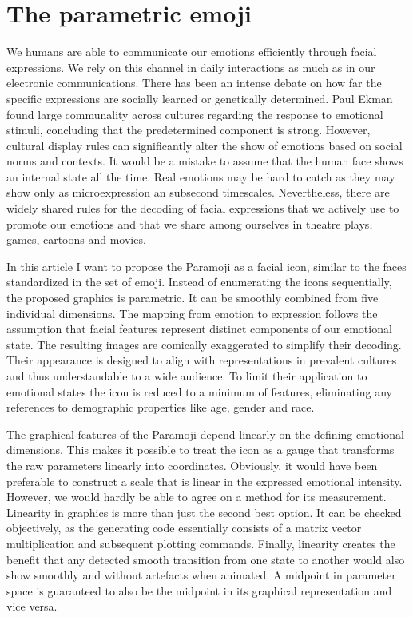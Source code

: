 \section{The parametric emoji}

We humans are able to communicate our emotions efficiently through facial expressions.
We rely on this channel in daily interactions as much as in our electronic communications.
There has been an intense debate on how far the specific expressions are
socially learned or genetically determined. Paul Ekman found large communality across cultures regarding
the response to emotional stimuli, concluding that the predetermined component is strong\cite{Ekman1971, Ekman72}.
However, cultural display rules can significantly alter the show of emotions based on social norms and contexts\cite{elfenbein2002}.
It would be a mistake to assume that the human face shows an internal state all the time.
Real emotions may be hard to catch as they may show only as microexpression an subsecond timescales.
Nevertheless, there are widely shared rules for the decoding of facial expressions that we
actively use to promote our emotions and that we share among ourselves in theatre plays, games, cartoons and movies.

In this article I want to propose the Paramoji as a facial icon, similar to the faces standardized in the set of emoji.
Instead of enumerating the icons sequentially, the proposed graphics is parametric. It can be smoothly
combined from five individual dimensions. The mapping from emotion to expression follows the assumption
that facial features represent distinct components of our emotional state\cite{Componential}.
The resulting images are comically exaggerated to simplify their decoding. Their appearance is designed to align with
representations in prevalent cultures and thus understandable to a wide audience. To limit their
application to emotional states the icon is reduced to a minimum of features, eliminating any
references to demographic properties like age, gender and race.

The graphical features of the Paramoji depend linearly on the defining emotional dimensions.
This makes it possible to treat the icon as a gauge that transforms the raw parameters linearly into coordinates.
Obviously, it would have been preferable to construct a scale that is linear in the expressed emotional intensity.
However, we would hardly be able to agree on a method for its measurement.
Linearity in graphics is more than just the second best option.
It can be checked objectively, as the generating code essentially consists of a matrix
vector multiplication and subsequent plotting commands.
Finally, linearity creates the benefit that any detected smooth
transition from one state to another would also show smoothly and without artefacts when animated. A midpoint
in parameter space is guaranteed to also be the midpoint in its graphical representation and vice versa.


